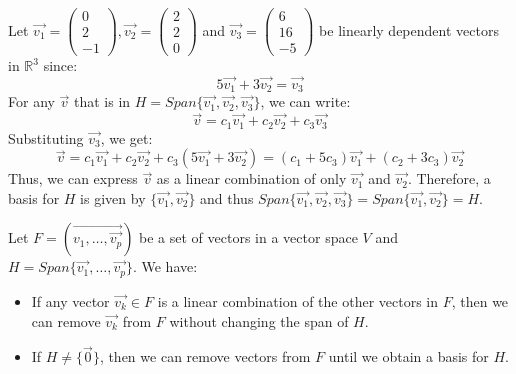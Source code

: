\begin{eg}
    Let $\vec{v_1} = \begin{pmatrix}
        0 \\ 2 \\ -1
    \end{pmatrix}, \vec{v_2} = \begin{pmatrix}
        2 \\ 2 \\ 0
    \end{pmatrix}$ and $\vec{v_3} = \begin{pmatrix}
        6 \\ 16 \\ -5
    \end{pmatrix}$ be linearly dependent vectors in $\mathbb{R}^3$ since:
    \[ 5\vec{v_1} + 3\vec{v_2} = \vec{v_3} \]
    For any $\vec{v}$ that is in $H = Span\{\vec{v_1}, \vec{v_2}, \vec{v_3}\}$, we can write:
    \[ \vec{v} = c_1 \vec{v_1} + c_2 \vec{v_2} + c_3 \vec{v_3} \]
    Substituting $\vec{v_3}$, we get:
    \[ \vec{v} = c_1 \vec{v_1} + c_2 \vec{v_2} + c_3 (5\vec{v_1} + 3\vec{v_2}) = (c_1 + 5c_3)\vec{v_1} + (c_2 + 3c_3)\vec{v_2} \]
    Thus, we can express $\vec{v}$ as a linear combination of only $\vec{v_1}$ and $\vec{v_2}$. Therefore, a basis for $H$ is given by $\{\vec{v_1}, \vec{v_2}\}$ and thus $Span\{\vec{v_1}, \vec{v_2}, \vec{v_3}\} = Span\{\vec{v_1}, \vec{v_2}\} = H$.
\end{eg}

\begin{theorem}
    Let $F = (\vec{v_1, \ldots, \vec{v_p}})$ be a set of vectors in a vector space $V$ and $H = Span\{\vec{v_1}, \ldots, \vec{v_p}\}$. We have:
    \begin{itemize}
        \item If any vector $\vec{v_k} \in F$ is a linear combination of the other vectors in $F$, then we can remove $\vec{v_k}$ from $F$ without changing the span of $H$.
        \item If $H \neq \{\vec{0}\}$, then we can remove vectors from $F$ until we obtain a basis for $H$.
    \end{itemize}
\end{theorem}

